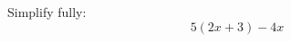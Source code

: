 \begin{question}
\noindent Simplify fully:
\[
5(2x + 3) - 4x
\]
\vspace{4cm}
\begin{flushright}
\end{flushright}
\end{question}
